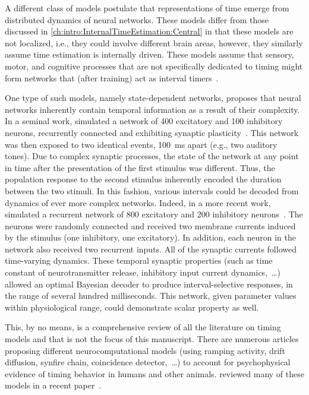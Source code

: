 A different class of models postulate that representations of time emerge from distributed dynamics of neural networks.
These models differ from those discussed in \autoref{ch:intro:InternalTimeEstimation:Central} in that these models are not localized, i.e., they could involve different brain areas, however, they similarly assume time estimation is internally driven.
These models assume that sensory, motor, and cognitive processes that are not specifically dedicated to timing might form networks that (after training) act as interval timers~\cite{Wittmann2013NatRevNeurosci}.
\par
One type of such models, namely state-dependent networks, proposes that neural networks inherently contain temporal information as a result of their complexity.
In a seminal work, \citeauthor{Karmarkar2007Neuron} simulated a network of 400 excitatory and 100 inhibitory neurons, recurrently connected and exhibiting synaptic plasticity~\cite{Karmarkar2007Neuron}.
This network was then exposed to two identical events, 100~ms apart (e.g., two auditory tones).
Due to complex synaptic processes, the state of the network at any point in time after the presentation of the first stimulus was different.
Thus, the population response to the second stimulus inherently encoded the duration between the two stimuli.
In this fashion, various intervals could be decoded from dynamics of ever more complex networks.
Indeed, in a more recent work, \citeauthor{Perez2018JNeurosci} simulated a recurrent network of 800 excitatory and 200 inhibitory neurons~\cite{Perez2018JNeurosci}.
The neurons were randomly connected and received two membrane currents induced by the stimulus (one inhibitory, one excitatory).
In addition, each neuron in the network also received two recurrent inputs.
All of the synaptic currents followed time-varying dynamics.
These temporal synaptic properties (such as time constant of neurotransmitter release, inhibitory input current dynamics,~\ldots) allowed an optimal Bayesian decoder to produce interval-selective responses, in the range of several hundred milliseconds.
This network, given parameter values within physiological range, could demonstrate scalar property as well.
\par
This, by no means, is a comprehensive review of all the literature on timing models and that is not the focus of this manuscript.
There are numerous articles proposing different neurocomputational models (using ramping activity, drift diffusion, synfire chain, coincidence detector,~\ldots) to account for psychophysical evidence of timing behavior in humans and other animals.
 reviewed many of these models in a recent paper~\cite{Paton2018NeuronRev}.


